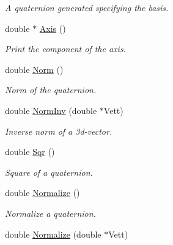 \begin{DoxyCompactItemize}
\begin{DoxyCompactList}\small\item\em \-A quaternion generated specifying the basis. \end{DoxyCompactList}\item 
\hypertarget{classQuadri_ae46739cce135a25e59e90f29fa990d7a}{double $\ast$ \hyperlink{classQuadri_ae46739cce135a25e59e90f29fa990d7a}{\-Axis} ()}\label{classQuadri_ae46739cce135a25e59e90f29fa990d7a}

\begin{DoxyCompactList}\small\item\em \-Print the component of the axis. \end{DoxyCompactList}\item 
\hypertarget{classQuadri_ac3486702edb3f0a9835908841db69cfd}{double \hyperlink{classQuadri_ac3486702edb3f0a9835908841db69cfd}{\-Norm} ()}\label{classQuadri_ac3486702edb3f0a9835908841db69cfd}

\begin{DoxyCompactList}\small\item\em \-Norm of the quaternion. \end{DoxyCompactList}\item 
\hypertarget{classQuadri_a2f02e2c03155a400cf1f36520d36eec1}{double \hyperlink{classQuadri_a2f02e2c03155a400cf1f36520d36eec1}{\-Norm\-Inv} (double $\ast$\-Vett)}\label{classQuadri_a2f02e2c03155a400cf1f36520d36eec1}

\begin{DoxyCompactList}\small\item\em \-Inverse norm of a 3d-\/vector. \end{DoxyCompactList}\item 
\hypertarget{classQuadri_aab277940763fb3eebc0a598cd86ff232}{double \hyperlink{classQuadri_aab277940763fb3eebc0a598cd86ff232}{\-Sqr} ()}\label{classQuadri_aab277940763fb3eebc0a598cd86ff232}

\begin{DoxyCompactList}\small\item\em \-Square of a quaternion. \end{DoxyCompactList}\item 
\hypertarget{classQuadri_aef629c102c4d237ef6e4897238f5bc18}{double \hyperlink{classQuadri_aef629c102c4d237ef6e4897238f5bc18}{\-Normalize} ()}\label{classQuadri_aef629c102c4d237ef6e4897238f5bc18}

\begin{DoxyCompactList}\small\item\em \-Normalize a quaternion. \end{DoxyCompactList}\item 
\hypertarget{classQuadri_a8ed7cb1fce0058d8ba75b30e0f07aa44}{double \hyperlink{classQuadri_a8ed7cb1fce0058d8ba75b30e0f07aa44}{\-Normalize} (double $\ast$\-Vett)}\label{classQuadri_a8ed7cb1fce0058d8ba75b30e0f07aa44}


\end{DoxyCompactItemize}
